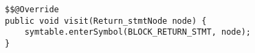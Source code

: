 \begin{lstlisting}[caption={If a return statement is encountered it, it is noted for the current scope.}, label={code:MISRE:returnstmt}]
$$@Override
public void visit(Return_stmtNode node) {
    symtable.enterSymbol(BLOCK_RETURN_STMT, node);
}
\end{lstlisting}